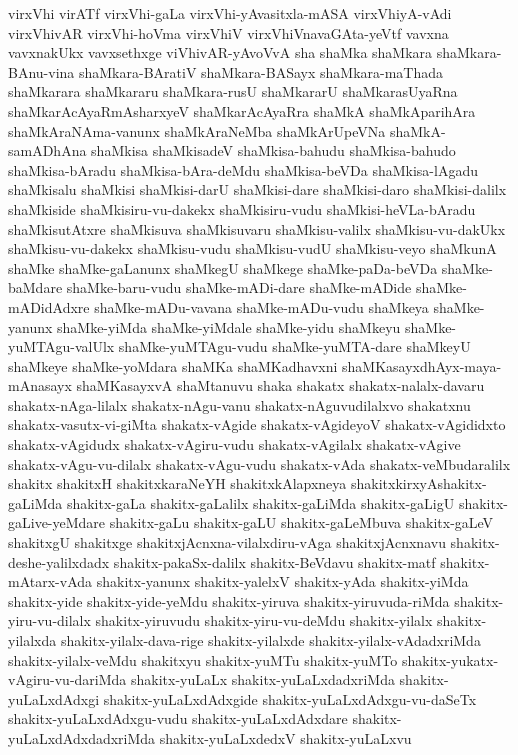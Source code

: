 {virxVhi
virATf
virxVhi-gaLa
virxVhi-yAvasitxla-mASA
virxVhiyA-vAdi
virxVhivAR
virxVhi-hoVma
virxVhiV
virxVhiVnavaGAta-yeVtf
vavxna
vavxnakUkx
vavxsethxge
viVhivAR-yAvoVvA
sha
shaMka
shaMkara
shaMkara-BAnu-vina
shaMkara-BAratiV
shaMkara-BASayx
shaMkara-maThada
shaMkarara
shaMkararu
shaMkara-rusU
shaMkararU
shaMkarasUyaRna
shaMkarAcAyaRmAsharxyeV
shaMkarAcAyaRra
shaMkA
shaMkAparihAra
shaMkAraNAma-vanunx
shaMkAraNeMba
shaMkArUpeVNa
shaMkA-samADhAna
shaMkisa
shaMkisadeV
shaMkisa-bahudu
shaMkisa-bahudo
shaMkisa-bAradu
shaMkisa-bAra-deMdu
shaMkisa-beVDa
shaMkisa-lAgadu
shaMkisalu
shaMkisi
shaMkisi-darU
shaMkisi-dare
shaMkisi-daro
shaMkisi-dalilx
shaMkiside
shaMkisiru-vu-dakekx
shaMkisiru-vudu
shaMkisi-heVLa-bAradu
shaMkisutAtxre
shaMkisuva
shaMkisuvaru
shaMkisu-valilx
shaMkisu-vu-dakUkx
shaMkisu-vu-dakekx
shaMkisu-vudu
shaMkisu-vudU
shaMkisu-veyo
shaMkunA
shaMke
shaMke-gaLanunx
shaMkegU
shaMkege
shaMke-paDa-beVDa
shaMke-baMdare
shaMke-baru-vudu
shaMke-mADi-dare
shaMke-mADide
shaMke-mADidAdxre
shaMke-mADu-vavana
shaMke-mADu-vudu
shaMkeya
shaMke-yanunx
shaMke-yiMda
shaMke-yiMdale
shaMke-yidu
shaMkeyu
shaMke-yuMTAgu-valUlx
shaMke-yuMTAgu-vudu
shaMke-yuMTA-dare
shaMkeyU
shaMkeye
shaMke-yoMdara
shaMKa
shaMKadhavxni
shaMKasayxdhAyx-maya-mAnasayx
shaMKasayxvA
shaMtanuvu
shaka
shakatx
shakatx-nalalx-davaru
shakatx-nAga-lilalx
shakatx-nAgu-vanu
shakatx-nAguvudilalxvo
shakatxnu
shakatx-vasutx-vi-giMta
shakatx-vAgide
shakatx-vAgideyoV
shakatx-vAgididxto
shakatx-vAgidudx
shakatx-vAgiru-vudu
shakatx-vAgilalx
shakatx-vAgive
shakatx-vAgu-vu-dilalx
shakatx-vAgu-vudu
shakatx-vAda
shakatx-veMbudaralilx
shakitx
shakitxH
shakitxkaraNeYH
shakitxkAlapxneya
shakitxkirxyAshakitx-gaLiMda
shakitx-gaLa
shakitx-gaLalilx
shakitx-gaLiMda
shakitx-gaLigU
shakitx-gaLive-yeMdare
shakitx-gaLu
shakitx-gaLU
shakitx-gaLeMbuva
shakitx-gaLeV
shakitxgU
shakitxge
shakitxjAcnxna-vilalxdiru-vAga
shakitxjAcnxnavu
shakitx-deshe-yalilxdadx
shakitx-pakaSx-dalilx
shakitx-BeVdavu
shakitx-matf
shakitx-mAtarx-vAda
shakitx-yanunx
shakitx-yalelxV
shakitx-yAda
shakitx-yiMda
shakitx-yide
shakitx-yide-yeMdu
shakitx-yiruva
shakitx-yiruvuda-riMda
shakitx-yiru-vu-dilalx
shakitx-yiruvudu
shakitx-yiru-vu-deMdu
shakitx-yilalx
shakitx-yilalxda
shakitx-yilalx-dava-rige
shakitx-yilalxde
shakitx-yilalx-vAdadxriMda
shakitx-yilalx-veMdu
shakitxyu
shakitx-yuMTu
shakitx-yuMTo
shakitx-yukatx-vAgiru-vu-dariMda
shakitx-yuLaLx
shakitx-yuLaLxdadxriMda
shakitx-yuLaLxdAdxgi
shakitx-yuLaLxdAdxgide
shakitx-yuLaLxdAdxgu-vu-daSeTx
shakitx-yuLaLxdAdxgu-vudu
shakitx-yuLaLxdAdxdare
shakitx-yuLaLxdAdxdadxriMda
shakitx-yuLaLxdedxV
shakitx-yuLaLxvu
}
